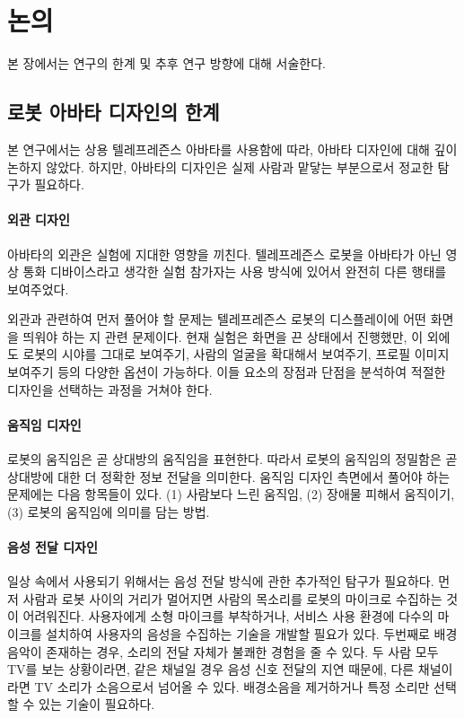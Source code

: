 \chapter{논의}
\label{sec:discussion}

본 장에서는 연구의 한계 및 추후 연구 방향에 대해 서술한다.

\section{로봇 아바타 디자인의 한계}

본 연구에서는 상용 텔레프레즌스 아바타를 사용함에 따라, 아바타 디자인에 대해 깊이 논하지 않았다. 하지만, 아바타의 디자인은 실제 사람과 맡닿는 부분으로서 정교한 탐구가 필요하다.


\subsubsection{외관 디자인}

아바타의 외관은 실험에 지대한 영향을 끼친다. 텔레프레즌스 로봇을 아바타가 아닌 영상 통화 디바이스라고 생각한 실험 참가자는 사용 방식에 있어서 완전히 다른 행태를 보여주었다.

외관과 관련하여 먼저 풀어야 할 문제는 텔레프레즌스 로봇의 디스플레이에 어떤 화면을 띄워야 하는 지 관련 문제이다. 현재 실험은 화면을 끈 상태에서 진행했만, 이 외에도 로봇의 시야를 그대로 보여주기, 사람의 얼굴을 확대해서 보여주기, 프로필 이미지 보여주기 등의 다양한 옵션이 가능하다. 이들 요소의 장점과 단점을 분석하여 적절한 디자인을 선택하는 과정을 거쳐야 한다.

\subsubsection{움직임 디자인}

로봇의 움직임은 곧 상대방의 움직임을 표현한다. 따라서 로봇의 움직임의 정밀함은 곧 상대방에 대한 더 정확한 정보 전달을 의미한다. 움직임 디자인 측면에서 풀어야 하는 문제에는 다음 항목들이 있다. (1) 사람보다 느린 움직임, (2) 장애물 피해서 움직이기, (3) 로봇의 움직임에 의미를 담는 방법.


\subsubsection{음성 전달 디자인}

일상 속에서 사용되기 위해서는 음성 전달 방식에 관한 추가적인 탐구가 필요하다. 먼저 사람과 로봇 사이의 거리가 멀어지면 사람의 목소리를 로봇의 마이크로 수집하는 것이 어려워진다. 사용자에게 소형 마이크를 부착하거나, 서비스 사용 환경에 다수의 마이크를 설치하여 사용자의 음성을 수집하는 기술을 개발할 필요가 있다. 두번째로 배경음악이 존재하는 경우, 소리의 전달 자체가 불쾌한 경험을 줄 수 있다. 두 사람 모두 TV를 보는 상황이라면, 같은 채널일 경우 음성 신호 전달의 지연 때문에, 다른 채널이라면 TV 소리가 소음으로서 넘어올 수 있다. 배경소음을 제거하거나 특정 소리만 선택할 수 있는 기술\cite{flanagan1993spatially}이 필요하다.  

